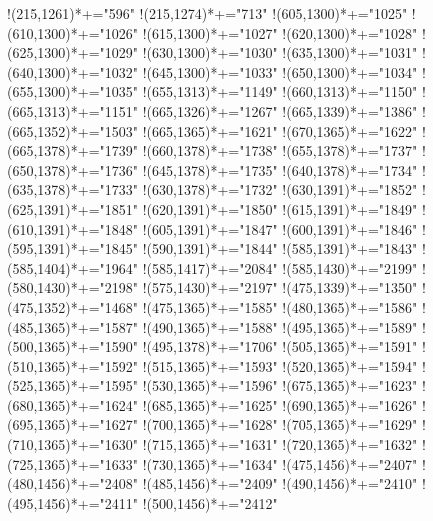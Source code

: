 \documentclass[12pt]{amsart}
\begin{document}
{ !{(215,1261)}*+{\bullet}="596" 
 !{(215,1274)}*+{\bullet}="713" 
 !{(605,1300)}*+{\bullet}="1025" 
 !{(610,1300)}*+{\bullet}="1026" 
 !{(615,1300)}*+{\bullet}="1027" 
 !{(620,1300)}*+{\bullet}="1028" 
 !{(625,1300)}*+{\bullet}="1029" 
 !{(630,1300)}*+{\bullet}="1030" 
 !{(635,1300)}*+{\bullet}="1031" 
 !{(640,1300)}*+{\bullet}="1032" 
 !{(645,1300)}*+{\bullet}="1033" 
 !{(650,1300)}*+{\bullet}="1034" 
 !{(655,1300)}*+{\bullet}="1035" 
 !{(655,1313)}*+{\bullet}="1149" 
 !{(660,1313)}*+{\bullet}="1150" 
 !{(665,1313)}*+{\bullet}="1151" 
 !{(665,1326)}*+{\bullet}="1267" 
 !{(665,1339)}*+{\bullet}="1386" 
 !{(665,1352)}*+{\bullet}="1503" 
 !{(665,1365)}*+{\bullet}="1621" 
 !{(670,1365)}*+{\bullet}="1622" 
 !{(665,1378)}*+{\bullet}="1739" 
 !{(660,1378)}*+{\bullet}="1738" 
 !{(655,1378)}*+{\bullet}="1737" 
 !{(650,1378)}*+{\bullet}="1736" 
 !{(645,1378)}*+{\bullet}="1735" 
 !{(640,1378)}*+{\bullet}="1734" 
 !{(635,1378)}*+{\bullet}="1733" 
 !{(630,1378)}*+{\bullet}="1732" 
 !{(630,1391)}*+{\bullet}="1852" 
 !{(625,1391)}*+{\bullet}="1851" 
 !{(620,1391)}*+{\bullet}="1850" 
 !{(615,1391)}*+{\bullet}="1849" 
 !{(610,1391)}*+{\bullet}="1848" 
 !{(605,1391)}*+{\bullet}="1847" 
 !{(600,1391)}*+{\bullet}="1846" 
 !{(595,1391)}*+{\bullet}="1845" 
 !{(590,1391)}*+{\bullet}="1844" 
 !{(585,1391)}*+{\bullet}="1843" 
 !{(585,1404)}*+{\bullet}="1964" 
 !{(585,1417)}*+{\bullet}="2084" 
 !{(585,1430)}*+{\bullet}="2199" 
 !{(580,1430)}*+{\bullet}="2198" 
 !{(575,1430)}*+{\bullet}="2197" 
 !{(475,1339)}*+{\bullet}="1350" 
 !{(475,1352)}*+{\bullet}="1468" 
 !{(475,1365)}*+{\bullet}="1585" 
 !{(480,1365)}*+{\bullet}="1586" 
 !{(485,1365)}*+{\bullet}="1587" 
 !{(490,1365)}*+{\bullet}="1588" 
 !{(495,1365)}*+{\bullet}="1589" 
 !{(500,1365)}*+{\bullet}="1590" 
 !{(495,1378)}*+{\bullet}="1706" 
 !{(505,1365)}*+{\bullet}="1591" 
 !{(510,1365)}*+{\bullet}="1592" 
 !{(515,1365)}*+{\bullet}="1593" 
 !{(520,1365)}*+{\bullet}="1594" 
 !{(525,1365)}*+{\bullet}="1595" 
 !{(530,1365)}*+{\bullet}="1596" 
 !{(675,1365)}*+{\bullet}="1623" 
 !{(680,1365)}*+{\bullet}="1624" 
 !{(685,1365)}*+{\bullet}="1625" 
 !{(690,1365)}*+{\bullet}="1626" 
 !{(695,1365)}*+{\bullet}="1627" 
 !{(700,1365)}*+{\bullet}="1628" 
 !{(705,1365)}*+{\bullet}="1629" 
 !{(710,1365)}*+{\bullet}="1630" 
 !{(715,1365)}*+{\bullet}="1631" 
 !{(720,1365)}*+{\bullet}="1632" 
 !{(725,1365)}*+{\bullet}="1633" 
 !{(730,1365)}*+{\bullet}="1634" 
 !{(475,1456)}*+{\bullet}="2407" 
 !{(480,1456)}*+{\bullet}="2408" 
 !{(485,1456)}*+{\bullet}="2409" 
 !{(490,1456)}*+{\bullet}="2410" 
 !{(495,1456)}*+{\bullet}="2411" 
 !{(500,1456)}*+{\bullet}="2412" 
}
\end{document}
